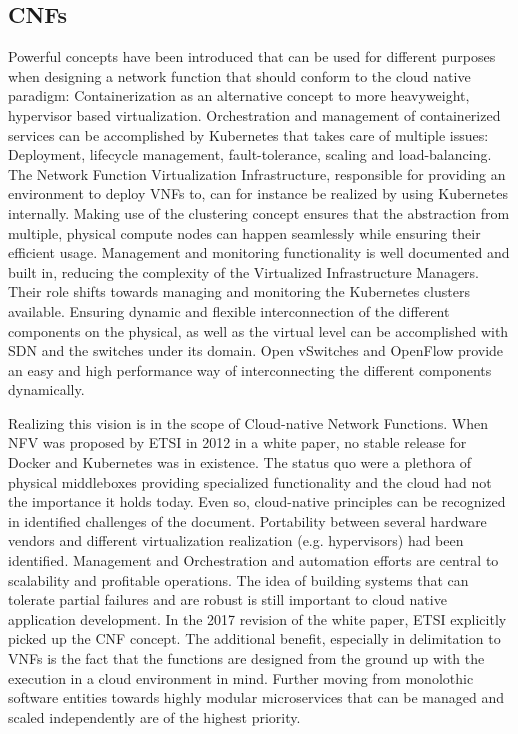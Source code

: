 \subsection{CNFs}
Powerful concepts have been introduced that can be used for different purposes when designing a network function that should conform to the cloud native paradigm: Containerization as an alternative concept to more heavyweight, hypervisor based virtualization. Orchestration and management of containerized services can be accomplished by Kubernetes that takes care of multiple issues: Deployment, lifecycle management, fault-tolerance, scaling and load-balancing. The Network Function Virtualization Infrastructure, responsible for providing an environment to deploy VNFs to, can for instance be realized by using Kubernetes internally. Making use of the clustering concept ensures that the abstraction from multiple, physical compute nodes can happen seamlessly while ensuring their efficient usage. Management and monitoring functionality is well documented and built in, reducing the complexity of the Virtualized Infrastructure Managers. Their role shifts towards managing and monitoring the Kubernetes clusters available. Ensuring dynamic and flexible interconnection of the different components on the physical, as well as the virtual level can be accomplished with SDN and the switches under its domain. Open vSwitches and OpenFlow provide an easy and high performance way of interconnecting the different components dynamically. 

Realizing this vision is in the scope of Cloud-native Network Functions. When NFV was proposed by ETSI in 2012 in a white paper, no stable release for Docker and Kubernetes was in existence. The status quo were a plethora of physical middleboxes providing specialized functionality and the cloud had not the importance it holds today. Even so, cloud-native principles can be recognized in identified challenges of the document. Portability between several hardware vendors and different virtualization realization (e.g. hypervisors) had been identified. Management and Orchestration and automation efforts are central to scalability and profitable operations. The idea of building systems that can tolerate partial failures and are robust is still important to cloud native application development.
In the 2017 revision of the white paper, ETSI explicitly picked up the CNF concept. The additional benefit, especially in delimitation to VNFs is the fact that the functions are designed from the ground up with the execution in a cloud environment in mind. Further moving from monolothic software entities towards highly modular microservices that can be managed and scaled independently are of the highest priority.

